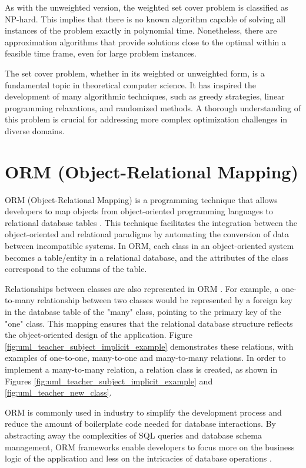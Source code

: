         As with the unweighted version, the weighted set cover problem is classified as NP-hard. This implies that there is no known algorithm capable of solving all instances of the problem exactly in polynomial time. Nonetheless, there are approximation algorithms that provide solutions close to the optimal within a feasible time frame, even for large problem instances.

        The set cover problem, whether in its weighted or unweighted form, is a fundamental topic in theoretical computer science. It has inspired the development of many algorithmic techniques, such as greedy strategies, linear programming relaxations, and randomized methods. A thorough understanding of this problem is crucial for addressing more complex optimization challenges in diverse domains.



    \section{ORM (Object-Relational Mapping)} \label{sec:orm}

    ORM (Object-Relational Mapping) is a programming technique that allows developers to map objects from object-oriented programming languages to relational database tables \cite{ambler2002object}.
    This technique facilitates the integration between the object-oriented and relational paradigms by automating the conversion of data between incompatible systems.
    In ORM, each class in an object-oriented system becomes a table/entity in a relational database, and the attributes of the class correspond to the columns of the table.

    Relationships between classes are also represented in ORM \cite{fowler2003patterns}. For example, a one-to-many relationship between two classes would be represented by a foreign key in the database table of the "many" class, pointing to the primary key of the "one" class. This mapping ensures that the relational database structure reflects the object-oriented design of the application. Figure \ref{fig:uml_teacher_subject_implicit_example} demonstrates these relations, with examples of one-to-one, many-to-one and many-to-many relations. 
    In order to implement a many-to-many relation, a relation class is created, as shown in Figures \ref{fig:uml_teacher_subject_implicit_example} and \ref{fig:uml_teacher_new_class}.



ORM is commonly used in industry to simplify the development process and reduce the amount of boilerplate code needed for database interactions. By abstracting away the complexities of SQL queries and database schema management, ORM frameworks enable developers to focus more on the business logic of the application and less on the intricacies of database operations \cite{larman2004applying}.


